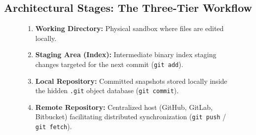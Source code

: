 \subsection{Architectural Stages: The Three-Tier Workflow}
\begin{figure}[htbp]
\centering
\begin{tcolorbox}[colback=white,colframe=primary,title=\textbf{Git Architecture: The Four Lifecycle Zones}]
\begin{enumerate}[leftmargin=*]
    \item \textbf{Working Directory:} Physical sandbox where files are edited locally.
    \item \textbf{Staging Area (Index):} Intermediate binary index staging changes targeted for the next commit (\texttt{git add}).
    \item \textbf{Local Repository:} Committed snapshots stored locally inside the hidden \texttt{.git} object database (\texttt{git commit}).
    \item \textbf{Remote Repository:} Centralized host (GitHub, GitLab, Bitbucket) facilitating distributed synchronization (\texttt{git push} / \texttt{git fetch}).
\end{enumerate}
\end{tcolorbox}
\end{figure}

